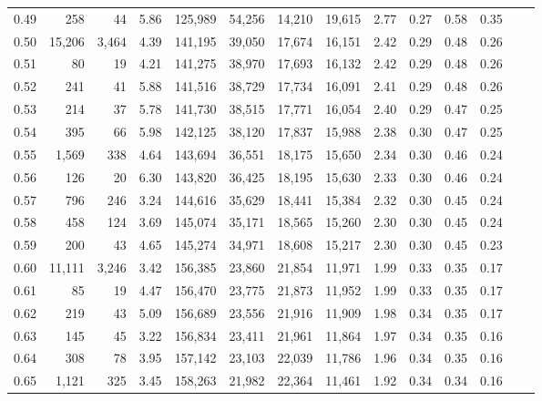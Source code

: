 \begin{tabular}{rrrrrrrrrrrrrr}
0.49 &     258 &     44 &    5.86 &  125,989 &   54,256 &  14,210 &  19,615 &  2.77 &  0.27 &  0.58 &      0.35 \\
0.50 &  15,206 &  3,464 &    4.39 &  141,195 &   39,050 &  17,674 &  16,151 &  2.42 &  0.29 &  0.48 &      0.26 \\
0.51 &      80 &     19 &    4.21 &  141,275 &   38,970 &  17,693 &  16,132 &  2.42 &  0.29 &  0.48 &      0.26 \\
0.52 &     241 &     41 &    5.88 &  141,516 &   38,729 &  17,734 &  16,091 &  2.41 &  0.29 &  0.48 &      0.26 \\
0.53 &     214 &     37 &    5.78 &  141,730 &   38,515 &  17,771 &  16,054 &  2.40 &  0.29 &  0.47 &      0.25 \\
0.54 &     395 &     66 &    5.98 &  142,125 &   38,120 &  17,837 &  15,988 &  2.38 &  0.30 &  0.47 &      0.25 \\
0.55 &   1,569 &    338 &    4.64 &  143,694 &   36,551 &  18,175 &  15,650 &  2.34 &  0.30 &  0.46 &      0.24 \\
0.56 &     126 &     20 &    6.30 &  143,820 &   36,425 &  18,195 &  15,630 &  2.33 &  0.30 &  0.46 &      0.24 \\
0.57 &     796 &    246 &    3.24 &  144,616 &   35,629 &  18,441 &  15,384 &  2.32 &  0.30 &  0.45 &      0.24 \\
0.58 &     458 &    124 &    3.69 &  145,074 &   35,171 &  18,565 &  15,260 &  2.30 &  0.30 &  0.45 &      0.24 \\
0.59 &     200 &     43 &    4.65 &  145,274 &   34,971 &  18,608 &  15,217 &  2.30 &  0.30 &  0.45 &      0.23 \\
0.60 &  11,111 &  3,246 &    3.42 &  156,385 &   23,860 &  21,854 &  11,971 &  1.99 &  0.33 &  0.35 &      0.17 \\
0.61 &      85 &     19 &    4.47 &  156,470 &   23,775 &  21,873 &  11,952 &  1.99 &  0.33 &  0.35 &      0.17 \\
0.62 &     219 &     43 &    5.09 &  156,689 &   23,556 &  21,916 &  11,909 &  1.98 &  0.34 &  0.35 &      0.17 \\
0.63 &     145 &     45 &    3.22 &  156,834 &   23,411 &  21,961 &  11,864 &  1.97 &  0.34 &  0.35 &      0.16 \\
0.64 &     308 &     78 &    3.95 &  157,142 &   23,103 &  22,039 &  11,786 &  1.96 &  0.34 &  0.35 &      0.16 \\
0.65 &   1,121 &    325 &    3.45 &  158,263 &   21,982 &  22,364 &  11,461 &  1.92 &  0.34 &  0.34 &      0.16 \\

\end{tabular}
